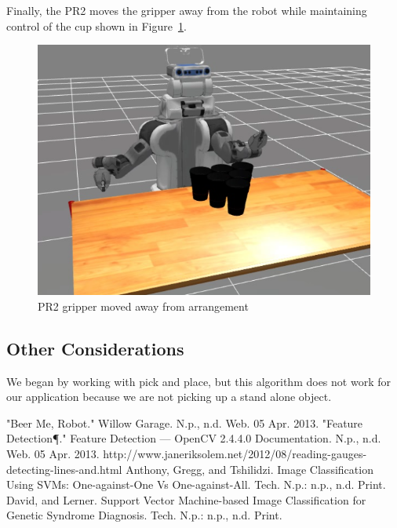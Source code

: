 \documentclass[letterpaper, 10 pt, conference]{ieeeconf}  %
\begin{document}
Finally, the PR2 moves the gripper away from the robot while maintaining control of the cup shown in Figure~\ref{fig:away}.

\begin{figure}[thpb]
      \centering
	  \includegraphics[scale =0.3]{gripper_away}
      \caption{PR2 gripper moved away from arrangement}
      \label{fig:away}
\end{figure}


\subsection{Other Considerations}
We began by working with pick and place, but this algorithm does not work for our application because we are not picking up a stand alone object.












\begin{thebibliography}{99}

 "Beer Me, Robot." Willow Garage. N.p., n.d. Web. 05 Apr. 2013.
 "Feature Detection¶." Feature Detection — OpenCV 2.4.4.0 Documentation. N.p., n.d. Web. 05 Apr. 2013.
 http://www.janeriksolem.net/2012/08/reading-gauges-detecting-lines-and.html
 Anthony, Gregg, and Tshilidzi. Image Classification Using SVMs: One-against-One Vs One-against-All. Tech. N.p.: n.p., n.d. Print.
 David, and Lerner. Support Vector Machine-based Image Classiﬁcation for Genetic Syndrome Diagnosis. Tech. N.p.: n.p., n.d. Print.







\end{thebibliography}
\end{document}
